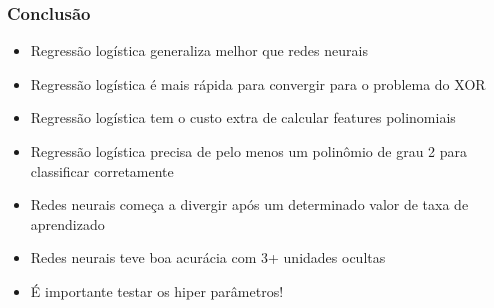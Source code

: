 \documentclass[10pt]{beamer}
\begin{document}
\begin{frame}[fragile]
  \frametitle{Conclusão}

  \begin{itemize}

    \item Regressão logística generaliza melhor que redes neurais

    \item Regressão logística é mais rápida para convergir para o problema do XOR

    \item Regressão logística tem o custo extra de calcular features polinomiais

    \item Regressão logística precisa de pelo menos um polinômio de grau 2 para classificar corretamente

    \item Redes neurais começa a divergir após um determinado valor de taxa de aprendizado

    \item Redes neurais teve boa acurácia com 3+ unidades ocultas

    \item É importante testar os hiper parâmetros!

  \end{itemize}

\end{frame}









\end{document}
